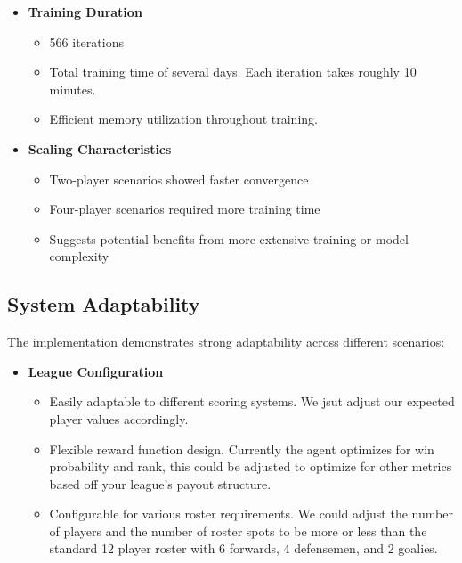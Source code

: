 \documentclass[11pt]{article}
\begin{document}
\begin{itemize}
    \item \textbf{Training Duration}
    \begin{itemize}
        \item 566 iterations
        \item Total training time of several days. Each iteration takes roughly 10 minutes.
        \item Efficient memory utilization throughout training.
    \end{itemize}
    
    \item \textbf{Scaling Characteristics}
    \begin{itemize}
        \item Two-player scenarios showed faster convergence
        \item Four-player scenarios required more training time
        \item Suggests potential benefits from more extensive training or model complexity
    \end{itemize}
\end{itemize}

\subsection{System Adaptability}
The implementation demonstrates strong adaptability across different scenarios:

\begin{itemize}
    \item \textbf{League Configuration}
    \begin{itemize}
        \item Easily adaptable to different scoring systems. We jsut adjust our expected player values accordingly.
        \item Flexible reward function design. Currently the agent optimizes for win probability and rank, this could be adjusted to optimize for other metrics based off your league's payout structure.
        \item Configurable for various roster requirements. We could adjust the number of players and the number of roster spots to be more or less than the standard 12 player roster with 6 forwards, 4 defensemen, and 2 goalies.
    \end{itemize}
    
\end{itemize}
\end{document}
